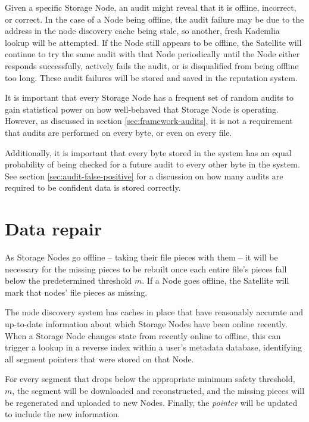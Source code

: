 \documentclass[8pt,fleqn,openany]{book}
\begin{document}
Given a specific Storage Node, an audit might reveal that it is offline,
incorrect, or correct. In the case of a Node being offline, the audit failure
may be due to the address in the node discovery cache being stale, so another,
fresh Kademlia lookup will be attempted. If the Node still appears to be offline,
the Satellite will continue to try the same audit with that Node periodically
until the Node either responds successfully, actively fails the audit, or
is disqualified from being offline too long.
These audit failures will be stored and saved in the reputation system.

It is important that every Storage Node has a frequent set of random audits to
gain statistical power on how well-behaved that Storage Node is operating.
However, as discussed in section \ref{sec:framework-audits}, it is
not a requirement that audits are performed on every byte, or even on every
file.

Additionally, it is important that every byte stored in the system has an equal
probability of being checked for a future audit to every other byte in the
system. See section \ref{sec:audit-false-positive} for a discussion on
how many audits are required to be confident data is stored correctly.

\section{Data repair}\label{sec:concrete-data-repair}

As Storage Nodes go offline -- taking their file pieces with them -- it will
be necessary for the missing pieces to be rebuilt once each entire file's pieces
fall below the predetermined threshold $m$. If a Node goes offline, the
Satellite will mark that nodes' file pieces as missing.

The node discovery system has caches in place that have reasonably accurate and
up-to-date information about which Storage Nodes have been online recently.
When a Storage Node changes state from recently online to offline, this can
trigger a lookup in a reverse index within a user's metadata database,
identifying all segment pointers that were stored on that Node.

For every segment that drops below the appropriate minimum safety
threshold, $m$, the segment will be downloaded and reconstructed, and the
missing pieces will be regenerated and uploaded to new Nodes. Finally, the
{\em pointer} will be updated to include the new information.
\end{document}
